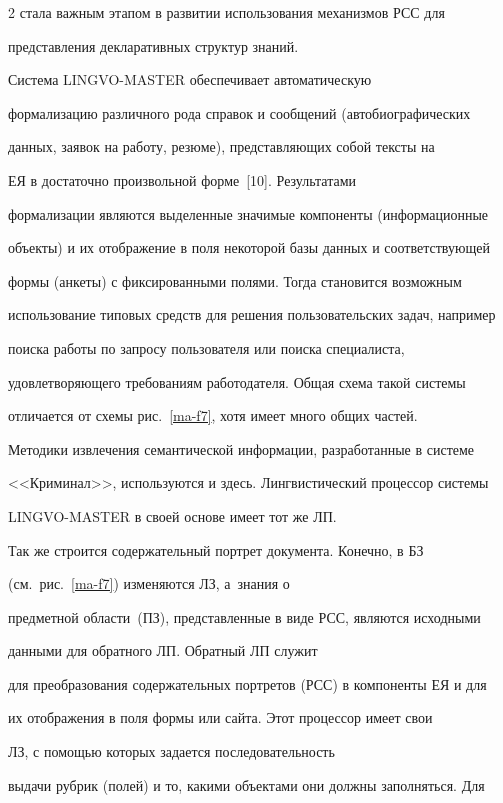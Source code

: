 \begin{multicols}{2}
стала важным этапом в развитии использования механизмов РСС для


представления декларативных структур знаний.





 Система LINGVO-MASTER обеспечивает автоматическую


формализацию различного рода справок и сообщений (автобиографических


данных, заявок на работу, резюме), представляющих собой тексты на


ЕЯ в достаточно произвольной форме~[10]. Результатами


формализации являются выделенные значимые компоненты (информационные


объекты) и их отображение в поля некоторой базы данных и соответствующей


формы (анкеты) с фиксированными полями. Тогда становится возможным


использование типовых средств для решения пользовательских задач, например


поиска работы по запросу пользователя или поиска специалиста,


удовлетворяющего требованиям работодателя. Общая схема такой системы


отличается от схемы рис.~\ref{ma-f7}, хотя имеет много общих частей.


Методики извлечения семантической информации, разработанные в системе


<<Криминал>>, используются и здесь. Лингвистический процессор системы


LINGVO-MASTER в своей основе имеет тот же ЛП.


Так же строится содержательный портрет документа. Конечно, в БЗ


(см.\ рис.~\ref{ma-f7}) изменяются ЛЗ, а~знания о


предметной области~(ПЗ), представленные в виде РСС, являются исходными


данными для обратного ЛП. Обратный ЛП служит


для преобразования содержательных портретов (РСС) в компоненты ЕЯ и для


их отоб\-ра\-же\-ния в поля формы или сайта. Этот процессор имеет свои


ЛЗ, с помощью которых задается последовательность


выдачи руб\-рик (полей) и то, какими объектами они должны заполняться. Для



\end{multicols}
